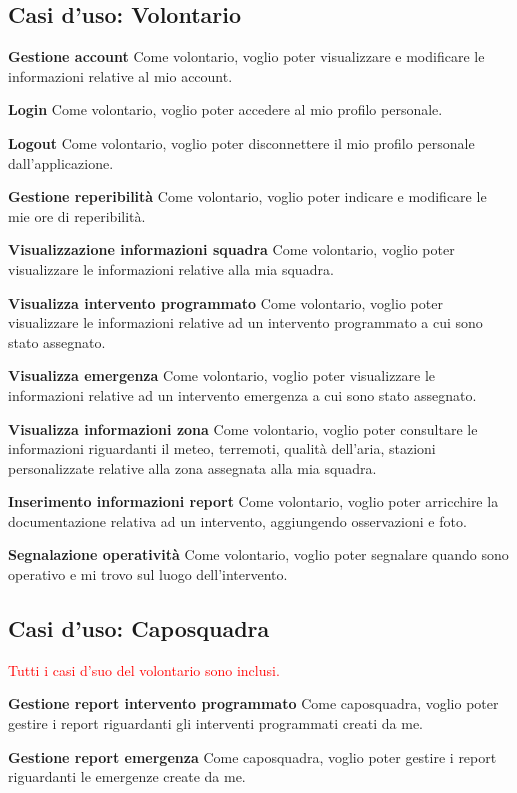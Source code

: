 \subsection{Casi d'uso: Volontario}
\textbf{Gestione account}
Come volontario, voglio poter visualizzare e modificare le informazioni relative al mio account.

\textbf{Login}
Come volontario, voglio poter accedere al mio profilo personale.

\textbf{Logout}
Come volontario, voglio poter disconnettere il mio profilo personale dall'applicazione.

\textbf{Gestione reperibilità}
Come volontario, voglio poter indicare e modificare le mie ore di reperibilità.

\textbf{Visualizzazione informazioni squadra}
Come volontario, voglio poter visualizzare le informazioni relative alla mia squadra.

\textbf{Visualizza intervento programmato}
Come volontario, voglio poter visualizzare le informazioni relative ad un intervento programmato a cui sono stato assegnato.

\textbf{Visualizza emergenza}
Come volontario, voglio poter visualizzare le informazioni relative ad un intervento emergenza a cui sono stato assegnato.

\textbf{Visualizza informazioni zona}
Come volontario, voglio poter consultare le informazioni riguardanti il meteo, terremoti, qualità dell'aria, stazioni personalizzate relative alla zona assegnata alla mia squadra.

\textbf{Inserimento informazioni report}
Come volontario, voglio poter arricchire la documentazione relativa ad un intervento, aggiungendo osservazioni e foto.

\textbf{Segnalazione operatività}
Come volontario, voglio poter segnalare quando sono operativo e mi trovo sul luogo dell'intervento.


\subsection{Casi d'uso: Caposquadra}

\textcolor{red}{Tutti i casi d'suo del volontario sono inclusi.}

\textbf{Gestione report intervento programmato}
Come caposquadra, voglio poter gestire i report riguardanti gli interventi programmati creati da me.

\textbf{Gestione report emergenza}
Come caposquadra, voglio poter gestire i report riguardanti le emergenze create da me.

